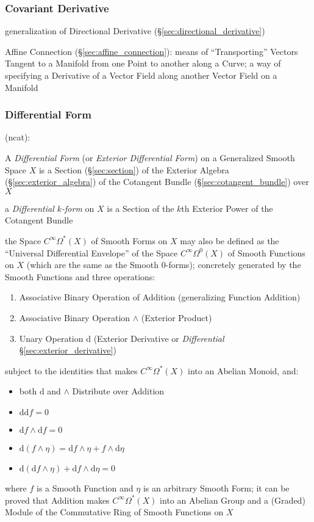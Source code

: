 \subsubsection{Covariant Derivative}\label{sec:covariant_derivative}

generalization of Directional Derivative (\S\ref{sec:directional_derivative})

\fist Affine Connection (\S\ref{sec:affine_connection}): means of
``Transporting'' Vectors Tangent to a Manifold from one Point to another along
a Curve; a way of specifying a Derivative of a Vector Field along another
Vector Field on a Manifold



\subsubsection{Differential Form}\label{sec:differential_form}

(ncat):

A \emph{Differential Form} (or \emph{Exterior Differential Form}) on a
Generalized Smooth Space $X$ is a Section (\S\ref{sec:section}) of the Exterior
Algebra (\S\ref{sec:exterior_algebra}) of the Cotangent Bundle
(\S\ref{sec:cotangent_bundle}) over $X$

a \emph{Differential $k$-form} on $X$ is a Section of the $k$th Exterior Power
of the Cotangent Bundle

the Space $C^\infty\Omega^*(X)$ of Smooth Forms on $X$ may also be defined as
the ``Universal Differential Envelope'' of the Space $C^\infty\Omega^0(X)$ of
Smooth Functions on $X$ (which are the same as the Smooth $0$-forms); concretely
generated by the Smooth Functions and three operations:
\begin{enumerate}
  \item Associative Binary Operation of Addition (generalizing Function
    Addition)
  \item Associative Binary Operation $\wedge$ (Exterior Product)
  \item Unary Operation $\mathrm{d}$ (Exterior Derivative or \emph{Differential}
    \S\ref{sec:exterior_derivative})
\end{enumerate}
subject to the identities that makes $C^\infty\Omega^*(X)$ into an Abelian
Monoid, and:
\begin{itemize}
  \item both $\mathrm{d}$ and $\wedge$ Distribute over Addition
  \item $\mathrm{dd} f = 0$
  \item $\mathrm{d}f \wedge \mathrm{d}f = 0$
  \item
    $\mathrm{d}(f\wedge\eta) = \mathrm{d}f\wedge\eta + f \wedge \mathrm{d}\eta$
  \item
    $\mathrm{d}(\mathrm{d}f\wedge\eta) + \mathrm{d}f\wedge\mathrm{d}\eta = 0$
\end{itemize}
where $f$ is a Smooth Function and $\eta$ is an arbitrary Smooth Form; it can be
proved that Addition makes $C^\infty\Omega^*(X)$ into an Abelian Group and a
(Graded) Module of the Commutative Ring of Smooth Functions on $X$

